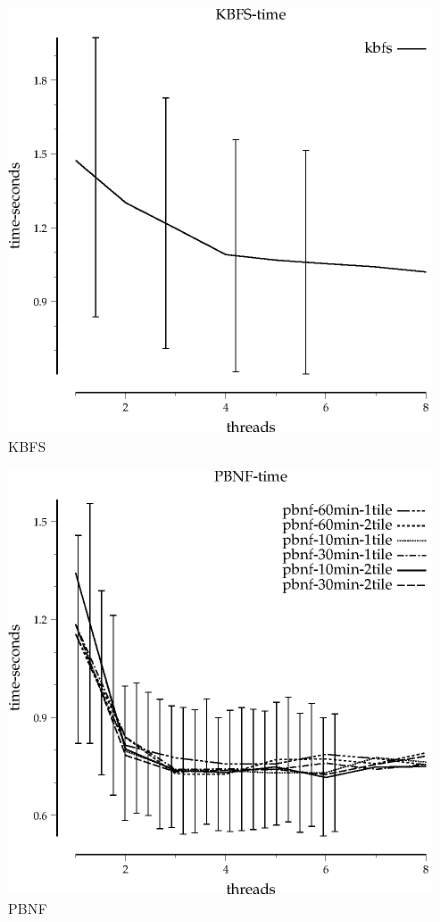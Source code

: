 \documentclass{article}
\begin{document}

\begin{figure}
\begin{center}
\includegraphics{KBFS-time}
\end{center}
\caption{KBFS}
\end{figure}

\begin{figure}
\begin{center}
\includegraphics{PBNF-time}
\end{center}
\caption{PBNF}
\end{figure}
\end{document}
